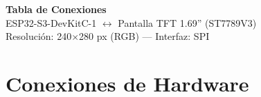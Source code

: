 \documentclass[11pt,a4paper]{article}
\begin{document}
\begin{center}
    {\LARGE\bfseries\color{azulESP} Tabla de Conexiones}\\[8pt]
    {\large ESP32-S3-DevKitC-1 $\longleftrightarrow$ Pantalla TFT 1.69'' (ST7789V3)}\\[4pt]
    {\normalsize\color{gray} Resolución: 240$\times$280 px (RGB) --- Interfaz: SPI}\\[12pt]
\end{center}

\section{Conexiones de Hardware}
\end{document}
